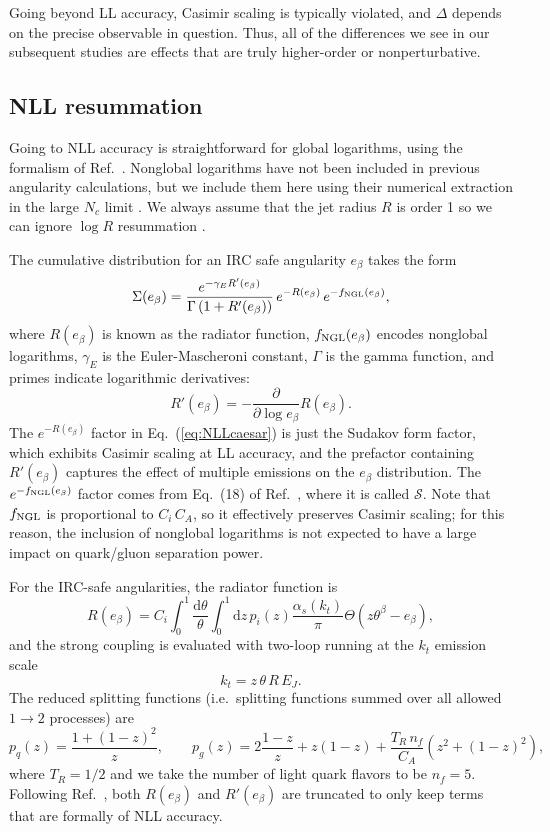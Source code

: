 \documentclass[11pt,letterpaper]{article}
\newcommand{\df}{\text{d}}
\DeclareRobustCommand{\Eq}[1]{Eq.~(\ref{#1})}
\DeclareRobustCommand{\Ref}[1]{Ref.~\cite{#1}}
\newcommand{\be}{\begin{equation}}
\newcommand{\ee}{\end{equation}}
\begin{document}
Going beyond LL accuracy, Casimir scaling is typically violated, and $\Delta$ depends on the precise observable in question.  Thus, all of the differences we see in our subsequent studies are effects that are truly higher-order or nonperturbative.

\subsection{NLL resummation}

Going to NLL accuracy is straightforward for global logarithms, using the formalism of \Ref{Banfi:2004yd}.  Nonglobal logarithms have not been included in previous angularity calculations, but we include them here using their numerical extraction in the large $N_c$ limit \cite{Dasgupta:2001sh}.  We always assume that the jet radius $R$ is order 1 so we can ignore $\log R$ resummation \cite{Dasgupta:2014yra}.

The cumulative distribution for an IRC safe angularity $e_\beta$ takes the form \cite{Banfi:2004yd,Dasgupta:2001sh}
\be
\label{eq:NLLcaesar}
\Sigma(e_\beta) =  \frac{e^{-\gamma_E R'(e_\beta)}}{\Gamma\left(1+R'(e_\beta)\right)} \, e^{-R(e_\beta)} \, e^{-f_{\rm NGL}(e_\beta)},
\ee
where $R(e_\beta)$ is known as the radiator function, $f_{\rm NGL}(e_\beta)$ encodes nonglobal logarithms, $\gamma_E$ is the Euler-Mascheroni constant, $\Gamma$ is the gamma function, and primes indicate logarithmic derivatives:
\be
\label{eq:R_der}
R'(e_\beta) = -\frac{\partial}{\partial \log e_\beta} R(e_\beta).  \ee
The $e^{-R(e_\beta)}$ factor in \Eq{eq:NLLcaesar} is just the Sudakov
form factor, which exhibits Casimir scaling at LL accuracy, and the
prefactor containing $R'(e_\beta)$ captures the effect of multiple
emissions on the $e_\beta$ distribution.  The
$e^{-f_{\rm NGL}(e_\beta)}$ factor comes from Eq.~(18) of
\Ref{Dasgupta:2001sh}, where it is called $\mathcal{S}$.  Note that
$f_{\rm NGL}$ is proportional to $C_i \,C_A$, so it effectively
preserves Casimir scaling; for this reason, the inclusion of nonglobal
logarithms is not expected to have a large impact on quark/gluon
separation power.

For the IRC-safe angularities, the radiator function is \cite{Larkoski:2013eya,Larkoski:2014pca}
\begin{equation}
\label{eq:radiatorC1}
R(e_\beta) = C_i \int_0^{1} \frac{\df \theta}{\theta}\int_0^1 \df  z\, p_i(z) \frac{\alpha_s(k_t)}{\pi} \Theta\left(z \theta^\beta -e_\beta \right),
\end{equation}
and the strong coupling is evaluated with two-loop running at the $k_t$ emission scale
\be
\label{eq:ktscale}
k_t = z \, \theta \,  R \, E_J.
\ee
The reduced splitting functions (i.e.~splitting functions summed over all allowed $1 \to 2$ processes) are 
\be
\label{eq:reducedsplitting}
p_q(z) = \frac{1 + (1-z)^2}{z}, \qquad p_g(z) = 2 \frac{1-z}{z} + z(1-z) + \frac{T_R \, n_f}{C_A} (z^2 + (1-z)^2),
\ee
where $T_R = 1/2$ and we take the number of light quark flavors to be $n_f = 5$.  Following \Ref{Larkoski:2014pca}, both $R(e_\beta)$ and $R'(e_\beta)$ are truncated to only keep terms that are formally of NLL accuracy.
\end{document}
